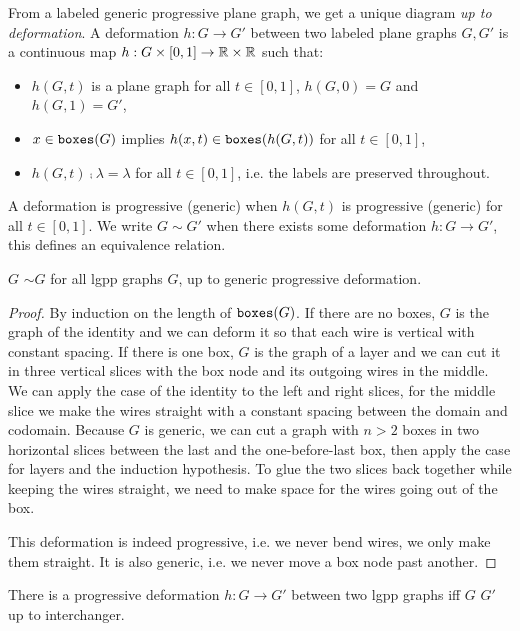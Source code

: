 From a labeled generic progressive plane graph, we get a unique diagram \emph{up to deformation}.
A deformation $h : G \to G'$ between two labeled plane graphs $G, G'$ is a continuous map $h : G \times [0, 1] \to \mathbb{R} \times \mathbb{R}$ such that:
\begin{itemize}
\item $h(G, t)$ is a plane graph for all $t \in [0, 1]$, $h(G, 0) = G$ and $h(G, 1) = G'$,
\item $x \in \mathtt{boxes}(G)$ implies $h(x, t) \in \mathtt{boxes}(h(G, t))$ for all $t \in [0, 1]$,
\item $h(G, t) \fcmp \lambda = \lambda$ for all $t \in [0, 1]$, i.e. the labels are preserved throughout.
\end{itemize}
A deformation is progressive (generic) when $h(G, t)$ is progressive (generic) for all $t \in [0, 1]$.
We write $G \sim G'$ when there exists some deformation $h : G \to G'$, this defines an equivalence relation.

\begin{proposition}\label{proposition:g2d then d2g}
 $G$ \py{))} $\sim G$ for all lgpp graphs $G$, up to generic progressive deformation.
\end{proposition}

\begin{proof}
By induction on the length of $\mathtt{boxes}(G)$.
If there are no boxes, $G$ is the graph of the identity and we can deform it so that each wire is vertical with constant spacing.
If there is one box, $G$ is the graph of a layer and we can cut it in three vertical slices with the box node and its outgoing wires in the middle.
We can apply the case of the identity to the left and right slices, for the middle slice we make the wires straight with a constant spacing between the domain and codomain.
Because $G$ is generic, we can cut a graph with $n > 2$ boxes in two horizontal slices between the last and the one-before-last box, then apply the case for layers and the induction hypothesis.
To glue the two slices back together while keeping the wires straight, we need to make space for the wires going out of the box.

This deformation is indeed progressive, i.e. we never bend wires, we only make them straight.
It is also generic, i.e. we never move a box node past another.
\end{proof}

\begin{proposition}\label{proposition:d2g then g2d}
There is a progressive deformation $h : G \to G'$ between two lgpp graphs iff  $G$  $G'$ \py{)} up to interchanger.
\end{proposition}

